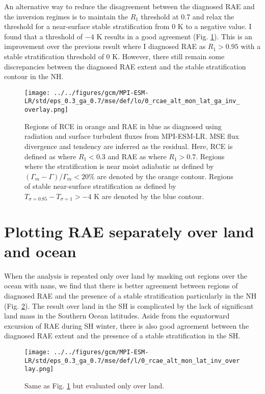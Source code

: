 \documentclass[11pt]{article}
\begin{document}
An alternative way to reduce the disagreement between the diagnosed RAE and the inversion regimes is to maintain the \(R_1\) threshold at 0.7 and relax the threshold for a near-surface stable stratification from 0 K to a negative value. I found that a threshold of \(-4\) K results in a good agreement (Fig. \ref{fig:org734dc14}). This is an improvement over the previous result where I diagnosed RAE as \(R_1>0.95\) with a stable stratification threshold of 0 K. However, there still remain some discrepancies between the diagnosed RAE extent and the stable stratification contour in the NH.

\begin{figure}[htbp]
\centering
\texttt{[image: ../../figures/gcm/MPI-ESM-LR/std/eps\_0.3\_ga\_0.7/mse/def/lo/0\_rcae\_alt\_mon\_lat\_ga\_inv\_overlay.png]}
\caption{\label{fig:org734dc14}Regions of RCE in orange and RAE in blue as diagnosed using radiation and surface turbulent fluxes from MPI-ESM-LR. MSE flux divergence and tendency are inferred as the residual. Here, RCE is defined as where \(R_1 < 0.3\) and RAE as where \(R_1 > 0.7\). Regions where the stratification is near moist adiabatic as defined by \((\Gamma_m-\Gamma)/\Gamma_m<20\%\) are denoted by the orange contour. Regions of stable near-surface stratification as defined by \(T_{\sigma=0.85}-T_{\sigma=1}>-4\) K are denoted by the blue contour.}
\end{figure}

\section{Plotting RAE separately over land and ocean}
\label{sec:orgddffd35}
When the analysis is repeated only over land by masking out regions over the ocean with nans, we find that there is better agreement between regions of diagnosed RAE and the presence of a stable stratification particularly in the NH (Fig. \ref{fig:org8bf6a4b}). The result over land in the SH is complicated by the lack of significant land mass in the Southern Ocean latitudes. Aside from the equatorward excursion of RAE during SH winter, there is also good agreement between the diagnosed RAE extent and the presence of a stable stratification in the SH.

\begin{figure}[htbp]
\centering
\texttt{[image: ../../figures/gcm/MPI-ESM-LR/std/eps\_0.3\_ga\_0.7/mse/def/l/0\_rcae\_alt\_mon\_lat\_inv\_overlay.png]}
\caption{\label{fig:org8bf6a4b}Same as Fig. \ref{fig:org734dc14} but evaluated only over land.}
\end{figure}
\end{document}
